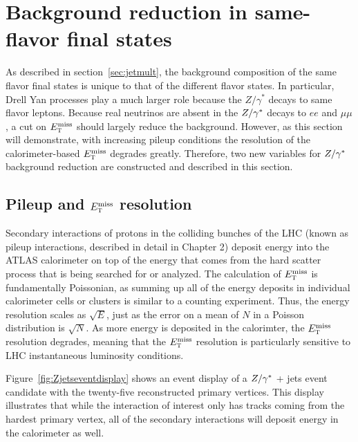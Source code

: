 \section{Background reduction in same-flavor final states}

As described in section~\ref{sec:jetmult}, the background composition of the same flavor final states is unique to that of the different flavor states. In particular, Drell Yan processes play a much larger role because the $Z/\gamma^{*}$ decays to same flavor leptons. Because real neutrinos are absent in the $Z/\gamma^{\ast}$ decays to $ee$ and $\mu\mu$, a cut on $E_{\textrm{\footnotesize\sc t}}^{\rm miss}$ should largely reduce the background. However, as this section will demonstrate, with increasing pileup conditions the resolution of the calorimeter-based $E_{\textrm{\footnotesize\sc t}}^{\rm miss}$ degrades greatly. Therefore, two new variables for $Z/\gamma^{\ast}$ background reduction are constructed and described in this section.

\subsection{Pileup and $E_{\textrm{\footnotesize\sc t}}^{\rm miss}$ resolution}

Secondary interactions of protons in the colliding bunches of the LHC (known as pileup interactions, described in detail in Chapter 2) deposit energy into the ATLAS calorimeter on top of the energy that comes from the hard scatter process that is being searched for or analyzed. The calculation of $E_{\textrm{\footnotesize\sc t}}^{\rm miss}$ is fundamentally Poissonian, as summing up all of the energy deposits in individual calorimeter cells or clusters is similar to a counting experiment. Thus, the energy resolution scales as $\sqrt{E}$, just as the error on a mean of $N$ in a Poisson distribution is $\sqrt{N}$. As more energy is deposited in the calorimter, the $E_{\textrm{\footnotesize\sc t}}^{\rm miss}$ resolution degrades, meaning that the $E_{\textrm{\footnotesize\sc t}}^{\rm miss}$ resolution is particularly sensitive to LHC instantaneous luminosity conditions. 

Figure~\ref{fig:Zjetseventdisplay} shows an event display of a $Z/\gamma^{\ast}$ + jets event candidate with the twenty-five reconstructed primary vertices. This display illustrates that while the interaction of interest only has tracks coming from the hardest primary vertex, all of the secondary interactions will deposit energy in the calorimeter as well.

